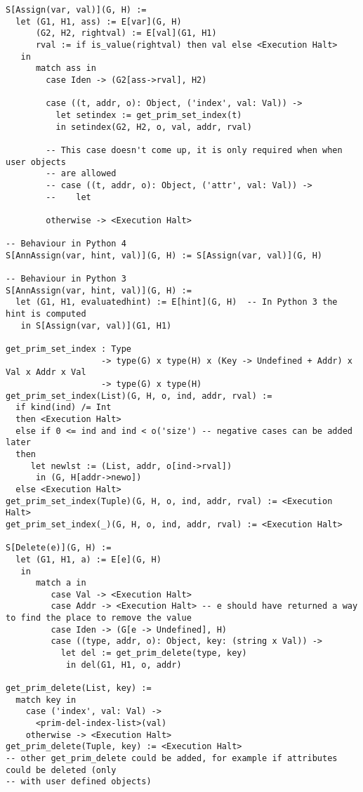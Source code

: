 \begin{verbatim}
S[Assign(var, val)](G, H) :=
  let (G1, H1, ass) := E[var](G, H)
      (G2, H2, rightval) := E[val](G1, H1)
      rval := if is_value(rightval) then val else <Execution Halt>
   in
      match ass in
        case Iden -> (G2[ass->rval], H2)

        case ((t, addr, o): Object, ('index', val: Val)) ->
          let setindex := get_prim_set_index(t)
          in setindex(G2, H2, o, val, addr, rval)

        -- This case doesn't come up, it is only required when when user objects
        -- are allowed
        -- case ((t, addr, o): Object, ('attr', val: Val)) ->
        --    let

        otherwise -> <Execution Halt>

-- Behaviour in Python 4
S[AnnAssign(var, hint, val)](G, H) := S[Assign(var, val)](G, H)

-- Behaviour in Python 3
S[AnnAssign(var, hint, val)](G, H) :=
  let (G1, H1, evaluatedhint) := E[hint](G, H)  -- In Python 3 the hint is computed
   in S[Assign(var, val)](G1, H1)

get_prim_set_index : Type
                   -> type(G) x type(H) x (Key -> Undefined + Addr) x Val x Addr x Val
                   -> type(G) x type(H)
get_prim_set_index(List)(G, H, o, ind, addr, rval) :=
  if kind(ind) /= Int
  then <Execution Halt>
  else if 0 <= ind and ind < o('size') -- negative cases can be added later
  then
     let newlst := (List, addr, o[ind->rval])
      in (G, H[addr->newo])
  else <Execution Halt>
get_prim_set_index(Tuple)(G, H, o, ind, addr, rval) := <Execution Halt>
get_prim_set_index(_)(G, H, o, ind, addr, rval) := <Execution Halt>

S[Delete(e)](G, H) :=
  let (G1, H1, a) := E[e](G, H)
   in
      match a in
         case Val -> <Execution Halt>
         case Addr -> <Execution Halt> -- e should have returned a way to find the place to remove the value
         case Iden -> (G[e -> Undefined], H)
         case ((type, addr, o): Object, key: (string x Val)) ->
           let del := get_prim_delete(type, key)
            in del(G1, H1, o, addr)

get_prim_delete(List, key) :=
  match key in
    case ('index', val: Val) ->
      <prim-del-index-list>(val)
    otherwise -> <Execution Halt>
get_prim_delete(Tuple, key) := <Execution Halt>
-- other get_prim_delete could be added, for example if attributes could be deleted (only
-- with user defined objects)


\end{verbatim}
